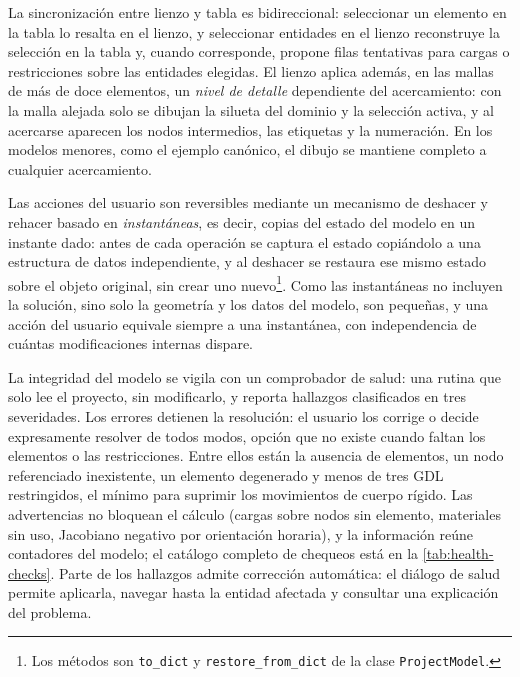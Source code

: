 La sincronización entre lienzo y tabla es bidireccional: seleccionar un elemento en la tabla lo resalta en el lienzo, y seleccionar entidades en el lienzo reconstruye la selección en la tabla y, cuando corresponde, propone filas tentativas para cargas o restricciones sobre las entidades elegidas. El lienzo aplica además, en las mallas de más de doce elementos, un \emph{nivel de detalle} dependiente del acercamiento: con la malla alejada solo se dibujan la silueta del dominio y la selección activa, y al acercarse aparecen los nodos intermedios, las etiquetas y la numeración. En los modelos menores, como el ejemplo canónico, el dibujo se mantiene completo a cualquier acercamiento.

Las acciones del usuario son reversibles mediante un mecanismo de deshacer y rehacer basado en \emph{instantáneas}, es decir, copias del estado del modelo en un instante dado: antes de cada operación se captura el estado copiándolo a una estructura de datos independiente, y al deshacer se restaura ese mismo estado sobre el objeto original, sin crear uno nuevo\footnote{Los métodos son \texttt{to\_dict} y \texttt{restore\_from\_dict} de la clase \texttt{ProjectModel}.}. Como las instantáneas no incluyen la solución, sino solo la geometría y los datos del modelo, son pequeñas, y una acción del usuario equivale siempre a una instantánea, con independencia de cuántas modificaciones internas dispare.

La integridad del modelo se vigila con un comprobador de salud: una rutina que solo lee el proyecto, sin modificarlo, y reporta hallazgos clasificados en tres severidades. Los errores detienen la resolución: el usuario los corrige o decide expresamente resolver de todos modos, opción que no existe cuando faltan los elementos o las restricciones. Entre ellos están la ausencia de elementos, un nodo referenciado inexistente, un elemento degenerado y menos de tres GDL restringidos, el mínimo para suprimir los movimientos de cuerpo rígido. Las advertencias no bloquean el cálculo (cargas sobre nodos sin elemento, materiales sin uso, Jacobiano negativo por orientación horaria), y la información reúne contadores del modelo; el catálogo completo de chequeos está en la \autoref{tab:health-checks}. Parte de los hallazgos admite corrección automática: el diálogo de salud permite aplicarla, navegar hasta la entidad afectada y consultar una explicación del problema.

